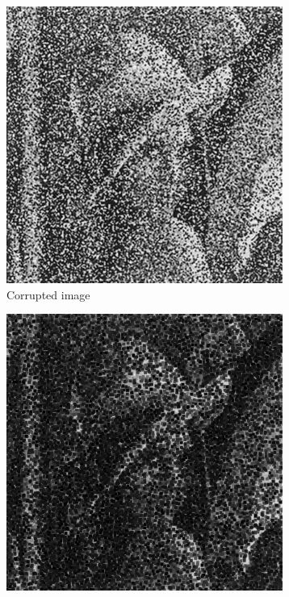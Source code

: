 \documentclass{article}
\begin{document}
\begin{figure}[H]
	\centering
	\begin{subfigure}{0.4\textwidth}
		\includegraphics[width=\textwidth]{Lena_corrupted.png}
		\caption{Corrupted image}
	\end{subfigure}
	\hfill
	\begin{subfigure}{0.4\textwidth}
		\includegraphics[width=\textwidth]{Generated/Lena_corrupted_min3filter.png}

\end{subfigure}
\end{figure}
\end{document}
